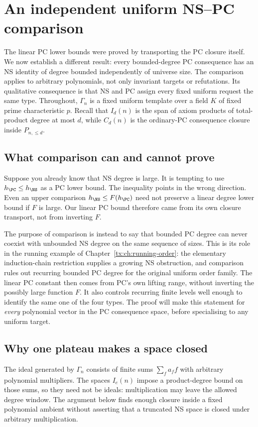 \chapter{An independent uniform NS--PC comparison}\label{tx:sec:comparison}
The linear PC lower bounds were proved by transporting the PC closure
itself. We now establish a different result: every bounded-degree PC
consequence has an NS identity of degree bounded independently of
universe size. The comparison applies to arbitrary polynomials, not
only invariant targets or refutations. Its qualitative consequence is
that NS and PC assign every fixed uniform request the same type.
Throughout, $\Gamma_n$ is a fixed uniform template over a field $K$
of fixed prime characteristic $p$. Recall that $I_d(n)$ is the span of
axiom products of total-product degree at most $d$, while $C_d(n)$ is
the ordinary-PC consequence closure inside $P_{n,\le d}$.

\section{What comparison can and cannot prove}
Suppose you already know that NS degree is large. It is tempting to use
$h_{\PC}\le h_{\NS}$ as a PC lower bound. The inequality points in the
wrong direction. Even an upper comparison $h_{\NS}\le F(h_{\PC})$
need not preserve a linear degree lower bound if $F$ is large. Our linear PC bound
therefore came from its own closure transport, not from inverting $F$.

The purpose of comparison is instead to say that bounded PC degree can
never coexist with unbounded NS degree on the same sequence of sizes.
This is its role in the running example of
Chapter~\ref{tx:ch:running-order}: the elementary induction-chain
restriction supplies a growing NS obstruction, and comparison rules
out recurring bounded PC degree for the original uniform order
family. The linear PC constant then comes from PC's own lifting
range, without inverting the possibly large function $F$.
It also controls recurring finite levels well enough to identify the
same one of the four types. The proof will make this statement for
\emph{every} polynomial vector in the PC consequence space, before
specialising to any uniform target.

\section{Why one plateau makes a space closed}
The ideal generated by $\Gamma_n$ consists of finite sums $\sum_f a_ff$
with arbitrary polynomial multipliers. The spaces $I_e(n)$ impose a
product-degree bound on those sums, so they need not be ideals:
multiplication may leave the allowed degree window. The argument below
finds enough closure inside a fixed polynomial ambient without asserting
that a truncated NS space is closed under arbitrary multiplication.

